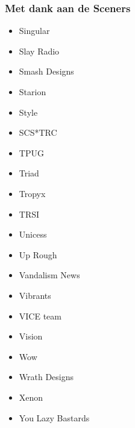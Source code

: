 \begin{frame}[noframenumbering]
\frametitle{Met dank aan de Sceners}

\begin{multicols}{3}
\begin{itemize}
\item Singular
\item Slay Radio
\item Smash Designs
\item Starion
\item Style
\item SCS*TRC
\item TPUG
\item Triad
\item Tropyx
\item TRSI
\item Unicess
\item Up Rough
\item Vandalism News
\item Vibrants
\item VICE team
\item Vision
\item Wow
\item Wrath Designs
\item Xenon
\item You Lazy Bastards
\end{itemize}
\end{multicols}

\end{frame}
